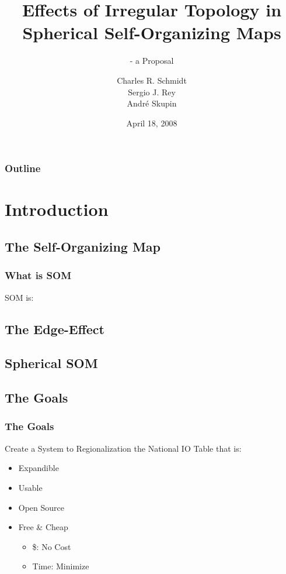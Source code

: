 \documentclass[nototal,handout]{beamer}
\author[Schmidt, Rey, Skupin]{Charles R. Schmidt\\Sergio J. Rey\\Andr\'e Skupin}
\institute[SDSU]{Department of Geography\\San Diego State University}
\title[Irregular Topology in Spherical-SOM]{Effects of Irregular Topology in Spherical Self-Organizing Maps}
\subtitle{- a Proposal}
\date[AAG]{April 18, 2008}
\begin{document}
\begin{frame}
  \titlepage
\end{frame}
\begin{frame}
  \frametitle{Outline}
  \tableofcontents[pausesections]
\end{frame}



\section{Introduction} 

\subsection{The Self-Organizing Map} 

\begin{frame}
	\frametitle{What is SOM}
  SOM is:
  
 \end{frame} 

\subsection{The Edge-Effect} 

\subsection{Spherical SOM} 

\subsection{The Goals} 

\begin{frame}
	\frametitle{The Goals}
  Create a System to Regionalization the National IO Table that is:
 \begin{itemize}
 \item  Expandible
 \item  Usable
 \item  Open Source
 \item  \alert{Free \& Cheap}
 \begin{itemize}
 \item  \$: No Cost
 \item  Time: Minimize
 \end{itemize}
 \end{itemize}
 \end{frame} 
\end{document}
